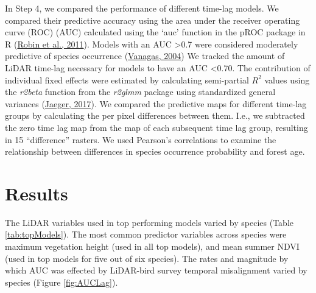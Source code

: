 \documentclass[
  12pt,
]{article}
\begin{document}
In Step 4, we compared the performance of different time-lag models. We compared their predictive accuracy using the area under the receiver operating curve (ROC) (AUC) calculated using the `auc' function in the pROC package in R (\protect\hyperlink{ref-robinPROCOpensourcePackage2011}{Robin et al., 2011}). Models with an AUC \textgreater0.7 were considered moderately predictive of species occurrence (\protect\hyperlink{ref-vanagasReceiverOperatingCharacteristic2004}{Vanagas, 2004}) We tracked the amount of LiDAR time-lag necessary for models to have an AUC \textless0.70. The contribution of individual fixed effects were estimated by calculating semi-partial \(R^2\) values using the \emph{r2beta} function from the \emph{r2glmm} package using standardized general variances (\protect\hyperlink{ref-jaegerR2glmmComputesSquared2017}{Jaeger, 2017}). We compared the predictive maps for different time-lag groups by calculating the per pixel differences between them. I.e., we subtracted the zero time lag map from the map of each subsequent time lag group, resulting in 15 ``difference'' rasters. We used Pearson's correlations to examine the relationship between differences in species occurrence probability and forest age.

\hypertarget{results}{%
\section{Results}\label{results}}

The LiDAR variables used in top performing models varied by species (Table \ref{tab:topModels}). The most common predictor variables across species were maximum vegetation height (used in all top models), and mean summer NDVI (used in top models for five out of six species). The rates and magnitude by which AUC was effected by LiDAR-bird survey temporal misalignment varied by species (Figure \ref{fig:AUCLag}).
\end{document}

